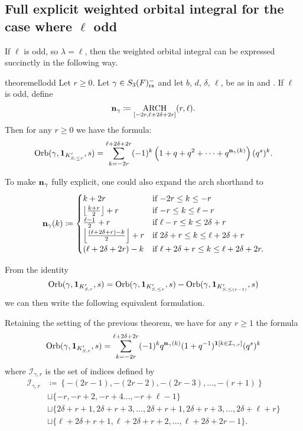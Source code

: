 \subsection{Full explicit weighted orbital integral for the case where $\ell$ odd}
If $\ell$ is odd, so $\lambda = \ell$, then
the weighted orbital integral can be expressed succinctly in the following way.
\begin{restatable}{theorem}{ellodd}
  \label{thm:full_orbital_ell_odd}
  Let $r \ge 0$.
  Let $\gamma \in S_3(F)_{\mathrm{rs}}^-$ and let $b$, $d$, $\delta$, $\ell$, be as in
   and .
  If $\ell$ is odd, define
  \[ \mathbf n_\gamma \coloneqq \operatorname*{ARCH}_{[-2r, \ell + 2\delta + 2r]}(r, \ell). \]
  Then for any $r \ge 0$ we have the formula:
  \[
    \operatorname{Orb}(\gamma, \mathbf{1}_{K'_{S, \le r}}, s)
    = \sum_{k = -2r}^{\ell + 2\delta + 2r}
    (-1)^k \left( 1 + q + q^2 + \dots + q^{\mathbf n_{\gamma}(k)} \right) (q^s)^k.
  \]
\end{restatable}
\begin{remark}
  To make $\mathbf n_\gamma$ fully explicit, one could also expand the arch shorthand to
  \[
    \mathbf n_\gamma(k)
    \coloneqq \begin{cases}
      k + 2r & \text{if } {-2r} \le k \le -r \\
      \left\lfloor \frac{k+r}{2} \right\rfloor + r & \text{if }{-r} \le k \le \ell-r \\
      \frac{\ell-1}{2} + r & \text{if } \ell - r \le k \le 2\delta + r \\
      \left\lfloor \frac{(\ell+2\delta+r)-k}{2} \right\rfloor + r & \text{if } 2\delta + r \le k \le \ell + 2\delta + r\\
      (\ell + 2\delta + 2r) - k & \text{if } \ell + 2\delta + r \le k \le \ell + 2\delta + 2r.
    \end{cases} \]
\end{remark}

From the identity
\[
  \operatorname{Orb}(\gamma, \mathbf{1}_{K'_{S, r}}, s)
  = \operatorname{Orb}(\gamma, \mathbf{1}_{K'_{S, \le r}}, s)
  - \operatorname{Orb}(\gamma, \mathbf{1}_{K'_{S, \le (r-1)}}, s)
\]
we can then write the following equivalent formulation.
\begin{corollary}
  Retaining the setting of the previous theorem, we have for any $r \ge 1$ the formula
  \[
    \operatorname{Orb}(\gamma, \mathbf{1}_{K'_{S, r}}, s)
    = \sum_{k = -2r}^{\ell + 2\delta + 2r}
    (-1)^k q^{\mathbf n_{\gamma}(k)}
    (1+q^{-1})^{\mathbf{1}[k \in \mathcal I_{\gamma, r}]}
    (q^s)^k
  \]
  where $\mathcal I_{\gamma, r}$ is the set of indices defined by
  \begin{align*}
    \mathcal{I}_{\gamma, r}
    &\coloneqq \left\{ -(2r-1), -(2r-2), -(2r-3), \dots, -(r+1) \right\} \\
    &\sqcup \{-r, -r+2, -r+4 \dots, -r+\ell-1 \} \\
    &\sqcup \{ 2\delta+r+1, 2\delta+r+3, \dots, 2\delta+r+1, 2\delta+r+3, \dots, 2\delta+\ell+r \} \\
    &\sqcup \{ \ell+2\delta+r+1, \ell+2\delta+r+2, \dots, \ell+2\delta+2r-1 \}.
  \end{align*}
\end{corollary}

